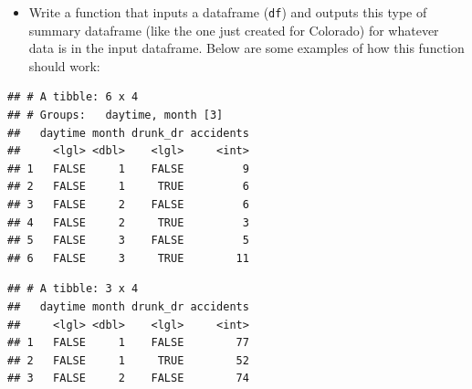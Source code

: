 \documentclass[]{book}
\makeatletter
\newenvironment{Shaded}{\begin{snugshade}}{\end{snugshade}}
\newcommand{\KeywordTok}[1]{\textcolor[rgb]{0.13,0.29,0.53}{\textbf{#1}}}
\newcommand{\DataTypeTok}[1]{\textcolor[rgb]{0.13,0.29,0.53}{#1}}
\newcommand{\DecValTok}[1]{\textcolor[rgb]{0.00,0.00,0.81}{#1}}
\newcommand{\StringTok}[1]{\textcolor[rgb]{0.31,0.60,0.02}{#1}}
\newcommand{\CommentTok}[1]{\textcolor[rgb]{0.56,0.35,0.01}{\textit{#1}}}
\newcommand{\OperatorTok}[1]{\textcolor[rgb]{0.81,0.36,0.00}{\textbf{#1}}}
\newcommand{\NormalTok}[1]{#1}
\providecommand{\tightlist}{%
  \setlength{\itemsep}{0pt}\setlength{\parskip}{0pt}}
\newenvironment{kframe}{%
\medskip{}
\setlength{\fboxsep}{.8em}
 \def\at@end@of@kframe{}%
 \ifinner\ifhmode%
  \def\at@end@of@kframe{\end{minipage}}%
  \begin{minipage}{\columnwidth}%
 \fi\fi%
 \def\FrameCommand##1{\hskip\@totalleftmargin \hskip-\fboxsep
 \colorbox{shadecolor}{##1}\hskip-\fboxsep
     \hskip-\linewidth \hskip-\@totalleftmargin \hskip\columnwidth}%
 \MakeFramed {\advance\hsize-\width
   \@totalleftmargin\z@ \linewidth\hsize
   \@setminipage}}%
 {\par\unskip\endMakeFramed%
 \at@end@of@kframe}
\renewenvironment{Shaded}{\begin{kframe}}{\end{kframe}}
\theoremstyle{definition}
\theoremstyle{definition}
\theoremstyle{definition}
\theoremstyle{remark}
\makeatother
\begin{document}
\begin{itemize}
\tightlist
\item
  Write a function that inputs a dataframe (\texttt{df}) and outputs
  this type of summary dataframe (like the one just created for
  Colorado) for whatever data is in the input dataframe. Below are some
  examples of how this function should work:
\end{itemize}

\begin{Shaded}
\end{Shaded}

\begin{verbatim}
## # A tibble: 6 x 4
## # Groups:   daytime, month [3]
##   daytime month drunk_dr accidents
##     <lgl> <dbl>    <lgl>     <int>
## 1   FALSE     1    FALSE         9
## 2   FALSE     1     TRUE         6
## 3   FALSE     2    FALSE         6
## 4   FALSE     2     TRUE         3
## 5   FALSE     3    FALSE         5
## 6   FALSE     3     TRUE        11
\end{verbatim}

\begin{Shaded}
\end{Shaded}

\begin{verbatim}
## # A tibble: 3 x 4
##   daytime month drunk_dr accidents
##     <lgl> <dbl>    <lgl>     <int>
## 1   FALSE     1    FALSE        77
## 2   FALSE     1     TRUE        52
## 3   FALSE     2    FALSE        74
\end{verbatim}
\end{document}
